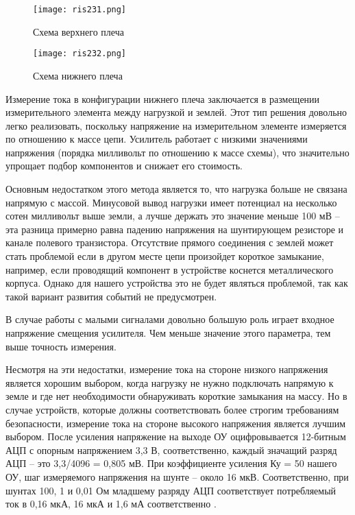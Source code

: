 \begin{figure}[H]
  \centering
  \texttt{[image: ris231.png]}
  \caption{Схема верхнего плеча}
  \label{ris:231}
\end{figure}

\begin{figure}[H]
  \centering
  \texttt{[image: ris232.png]}
  \caption{Схема нижнего плеча}
  \label{ris:232}
\end{figure}

Измерение тока в конфигурации нижнего плеча заключается в размещении измерительного 
элемента между нагрузкой и землей. Этот тип решения довольно легко реализовать, поскольку 
напряжение на измерительном элементе измеряется по отношению к массе цепи. Усилитель 
работает с низкими значениями напряжения (порядка милливольт по отношению к массе схемы), 
что значительно упрощает подбор компонентов и снижает его стоимость.

Основным недостатком этого метода является то, что нагрузка больше не связана напрямую с массой.
Минусовой вывод нагрузки имеет потенциал на несколько сотен милливольт выше земли, 
а лучше держать это значение меньше 100 мВ -- эта разница примерно равна падению напряжения
на шунтирующем резисторе и канале полевого транзистора. Отсутствие прямого соединения
с землей может стать проблемой если в другом месте цепи произойдет короткое замыкание,
  например, если проводящий компонент в устройстве коснется металлического корпуса. 
  Однако для нашего устройства это не будет являться проблемой, так как такой вариант 
  развития событий не предусмотрен.

В случае работы с малыми сигналами довольно большую роль играет входное напряжение 
  смещения усилителя. Чем меньше значение этого параметра, тем выше точность измерения.

Несмотря на эти недостатки, измерение тока на стороне низкого напряжения является хорошим выбором,
когда нагрузку не нужно подключать напрямую к земле и где нет необходимости обнаруживать 
короткие замыкания на массу. Но в случае устройств, которые должны соответствовать 
более строгим требованиям безопасности, измерение тока на стороне высокого 
напряжения является лучшим выбором.
После усиления напряжение на выходе ОУ оцифровывается 12-битным АЦП с опорным 
напряжением 3,3 В, соответственно, каждый значащий разряд АЦП -- это 3,3/4096 = 0,805 мВ.
При коэффициенте усиления Ку = 50 нашего ОУ, шаг измеряемого напряжения
на шунте -- около 16 мкВ. Соответственно, при шунтах 100, 1 и 0,01 Ом младшему 
разряду АЦП соответствует потребляемый ток в 0,16 мкА, 16 мкА и 1,6 мА соответственно 
\cite{GooglePatent:1}.

